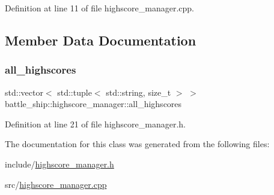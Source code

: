 Definition at line 11 of file highscore\+\_\+manager.\+cpp.



\subsection{Member Data Documentation}
\mbox{\label{classbattle__ship_1_1highscore__manager_a3a51d2dfb6210fea016ef59238d35861}} 
\subsubsection{\texorpdfstring{all\+\_\+highscores}{all\_highscores}}
{\footnotesize\ttfamily std\+::vector$<$ std\+::tuple$<$ std\+::string, size\+\_\+t $>$ $>$ battle\+\_\+ship\+::highscore\+\_\+manager\+::all\+\_\+highscores\hspace{0.3cm}{\ttfamily [static]}}



Definition at line 21 of file highscore\+\_\+manager.\+h.



The documentation for this class was generated from the following files\+:\begin{DoxyCompactItemize}
\item 
include/\hyperlink{highscore__manager_8h}{highscore\+\_\+manager.\+h}\item 
src/\hyperlink{highscore__manager_8cpp}{highscore\+\_\+manager.\+cpp}\end{DoxyCompactItemize}
